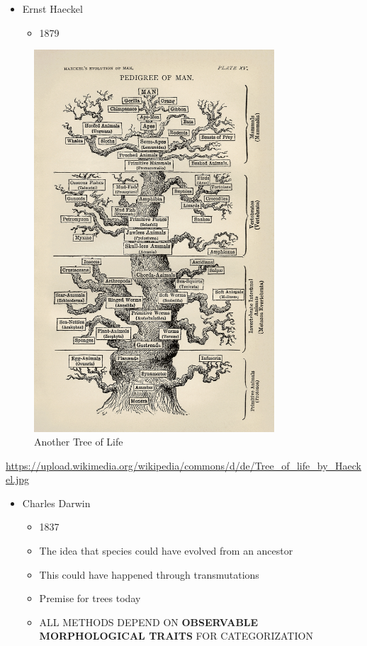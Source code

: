 \documentclass[
]{book}
\providecommand{\tightlist}{%
  \setlength{\itemsep}{0pt}\setlength{\parskip}{0pt}}
\begin{document}
\begin{itemize}
\tightlist
\item
  Ernst Haeckel

  \begin{itemize}
  \tightlist
  \item
    1879
  \end{itemize}
\end{itemize}

\begin{figure}
\centering
\includegraphics[width=0.8\textwidth,height=\textheight]{./Figures/Haeckel.png}
\caption{Another Tree of Life}
\end{figure}

\url{https://upload.wikimedia.org/wikipedia/commons/d/de/Tree_of_life_by_Haeckel.jpg}

\begin{itemize}
\tightlist
\item
  Charles Darwin

  \begin{itemize}
  \tightlist
  \item
    1837
  \item
    The idea that species could have evolved from an ancestor
  \item
    This could have happened through transmutations
  \item
    Premise for trees today
  \item
    ALL METHODS DEPEND ON \textbf{OBSERVABLE MORPHOLOGICAL TRAITS} FOR CATEGORIZATION
  \end{itemize}
\end{itemize}
\end{document}
